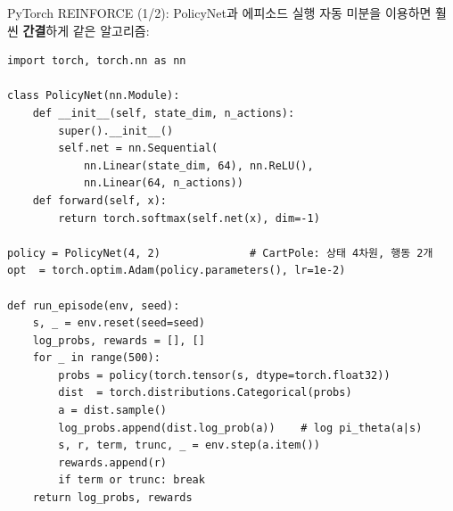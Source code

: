 \documentclass[aspectratio=169,11pt]{beamer}
\begin{document}

\begin{frame}[fragile]{PyTorch REINFORCE (1/2): PolicyNet과 에피소드 실행}
  자동 미분을 이용하면 훨씬 \textbf{간결}하게 같은 알고리즘:
\begin{lstlisting}
import torch, torch.nn as nn

class PolicyNet(nn.Module):
    def __init__(self, state_dim, n_actions):
        super().__init__()
        self.net = nn.Sequential(
            nn.Linear(state_dim, 64), nn.ReLU(),
            nn.Linear(64, n_actions))
    def forward(self, x):
        return torch.softmax(self.net(x), dim=-1)

policy = PolicyNet(4, 2)              # CartPole: 상태 4차원, 행동 2개
opt  = torch.optim.Adam(policy.parameters(), lr=1e-2)

def run_episode(env, seed):
    s, _ = env.reset(seed=seed)
    log_probs, rewards = [], []
    for _ in range(500):
        probs = policy(torch.tensor(s, dtype=torch.float32))
        dist  = torch.distributions.Categorical(probs)
        a = dist.sample()
        log_probs.append(dist.log_prob(a))    # log pi_theta(a|s)
        s, r, term, trunc, _ = env.step(a.item())
        rewards.append(r)
        if term or trunc: break
    return log_probs, rewards
\end{lstlisting}
\end{frame}
\end{document}

